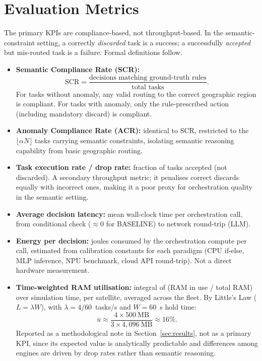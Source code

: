 \documentclass[conference,comsoc,twoside,caption=false]{IEEEtran}
\theoremstyle{definition}
\begin{document}
\section{Evaluation Metrics}
\label{sec:metrics}

The primary \acp{KPI} are compliance-based, not throughput-based. In the
semantic-constraint setting, a correctly \emph{discarded} task is a success; a
successfully \emph{accepted} but mis-routed task is a failure. Formal
definitions follow.

\begin{itemize}
  \item \textbf{Semantic Compliance Rate (SCR):}
    \begin{equation}
      \mathrm{SCR} = \frac{\text{decisions matching ground-truth rules}}
                          {\text{total tasks}}.
      \label{eq:scr}
    \end{equation}
    For tasks without anomaly, any valid routing to the correct geographic
    region is compliant. For tasks with anomaly, only the rule-prescribed
    action (including mandatory discard) is compliant.

  \item \textbf{Anomaly Compliance Rate (ACR):} identical to SCR, restricted
    to the $\lfloor \alpha N \rfloor$ tasks carrying semantic constraints,
    isolating semantic reasoning capability from basic geographic routing.

  \item \textbf{Task execution rate / drop rate:} fraction of tasks accepted
    (not discarded). A secondary throughput metric; it penalises correct
    discards equally with incorrect ones, making it a poor proxy for
    orchestration quality in the semantic setting.

  \item \textbf{Average decision latency:} mean wall-clock time per
    orchestration call, from conditional check ($\approx$0 for BASELINE) to
    network round-trip (LLM).

  \item \textbf{Energy per decision:} joules consumed by the orchestration
    compute per call, estimated from calibration constants for each paradigm
    (CPU if-else, MLP inference, NPU benchmark, cloud API round-trip). Not a
    direct hardware measurement.

  \item \textbf{Time-weighted RAM utilisation:} integral of
    (RAM in use / total RAM) over simulation time, per satellite, averaged
    across the fleet. By Little's Law ($L = \lambda W$), with
    $\lambda = 4/60$~tasks/s and $W = 60$~s hold time:
    \begin{equation}
      \bar{u} \approx \frac{4 \times 500~\text{MB}}{3 \times 4{,}096~\text{MB}}
               \approx 16\%.
      \label{eq:ram}
    \end{equation}
    Reported as a methodological note in Section~\ref{sec:results}, not as a
    primary KPI, since its expected value is analytically predictable and
    differences among engines are driven by drop rates rather than semantic
    reasoning.
\end{itemize}
\end{document}
